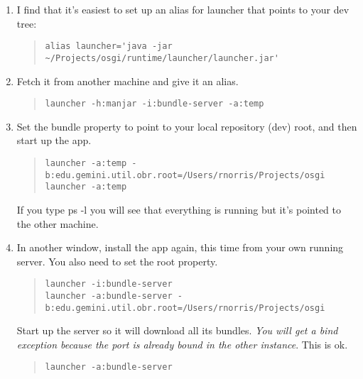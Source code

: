 \documentclass{report}
\begin{document}
\begin{enumerate}
  
\item I find that it's easiest to set up an alias for launcher that points to
your  dev tree:
\begin{quote}\begin{scriptsize}\begin{verbatim}
alias launcher='java -jar ~/Projects/osgi/runtime/launcher/launcher.jar'
\end{verbatim}\end{scriptsize}\end{quote}

\item Fetch it from another machine and give it an alias.
\begin{quote}\begin{scriptsize}\begin{verbatim}
launcher -h:manjar -i:bundle-server -a:temp
\end{verbatim}\end{scriptsize}\end{quote}

\item Set the bundle property to point to your local repository (dev) root, and
then start up the app.
\begin{quote}\begin{scriptsize}\begin{verbatim}
launcher -a:temp -b:edu.gemini.util.obr.root=/Users/rnorris/Projects/osgi 
launcher -a:temp
\end{verbatim}\end{scriptsize}\end{quote}
If you type ps -l you will see that everything is running but it's pointed
to the other machine.

\item In another window, install the app again, this time from your own running
server. You also need to set the root property.
\begin{quote}\begin{scriptsize}\begin{verbatim}
launcher -i:bundle-server 
launcher -a:bundle-server -b:edu.gemini.util.obr.root=/Users/rnorris/Projects/osgi
\end{verbatim}\end{scriptsize}\end{quote}
Start up the server so it will download all its bundles. {\it You will get a bind
exception because the port is already bound in the other instance}\/. This is
ok.
\begin{quote}\begin{scriptsize}\begin{verbatim}
launcher -a:bundle-server 
\end{verbatim}\end{scriptsize}\end{quote}


\end{enumerate}
\end{document}
